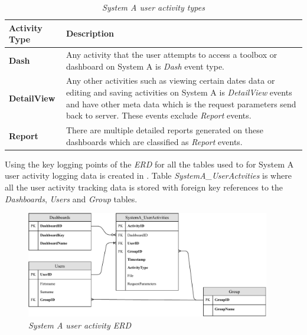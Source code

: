 \begin{table}[!htb]
	\centering
	\small
	\caption[System A user activity types]
	{\textit{System A user activity types}}
	\label{tbl:Ch2_SystemA_EventTypes}
	\begin{tabularx}{\textwidth}{|l|X|}
		\hline \textbf{Activity Type} & \textbf{Description} \\
		\hline \textbf{Dash} & Any activity that the user attempts to access a toolbox or dashboard on System A is \emph{Dash} event type. \\
		\hline \textbf{DetailView} & Any other activities such as viewing certain dates data or editing and saving activities on System A is \emph{DetailView} events and have other meta data which is the request parameters send back to server. These events exclude \emph{Report} events. \\
		\hline \textbf{Report} & There are multiple detailed reports generated on these dashboards which are classified as \emph{Report} events. \\
		\hline
	\end{tabularx}
\end{table}

Using the key logging points of  the \emph{ERD} for all the tables used to for System A user activity logging data is created in . Table \emph{SystemA\_UserActvities} is where all the user activity tracking data is stored with foreign key references to the \emph{Dashboards}, \emph{Users} and \emph{Group} tables.

\begin{figure}[!htb] %
	\centering %
	\includegraphics[width=0.95\textwidth]{Images/Chapter2/SystemA_ERD_Basic/SystemA_ERD_Basic.pdf}
	\caption[System A user activity ERD]
	{\textit{System A user activity ERD}}\label{fig:Ch2_SystemA_Basic_ERD}
\end{figure}

